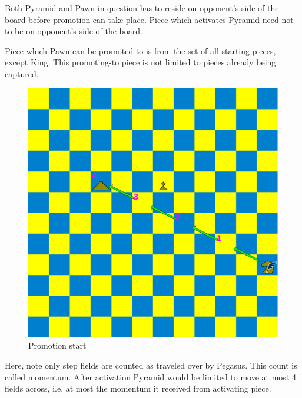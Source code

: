 \documentclass[a5paper,12pt,draft]{book} %
\begin{document}
Both Pyramid and Pawn in question has to reside on opponent's side of the
board before promotion can take place. Piece which activates Pyramid need
not to be on opponent's side of the board.

Piece which Pawn can be promoted to is from the set of all starting pieces,
except King. This promoting-to piece is not limited to pieces already being
captured.

\clearpage

\noindent
\begin{figure}[!h]
\includegraphics[width=1.0\textwidth, keepaspectratio=true]{../gfx/examples/04_move_pyramid_promo_init.png}
\caption{Promotion start}
\label{fig:ma_promo_init}
\end{figure}

Here, note only step fields are counted as traveled over by Pegasus. This
count is called momentum. After activation Pyramid would be limited to move
at most 4 fields across, i.e. at most the momentum it received from activating
piece.

\clearpage
\end{document}
